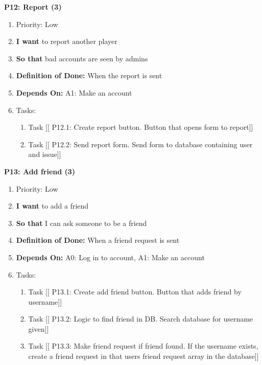 \textbf{P12: Report (3)}
\begin{enumerate}
    \item Priority: Low
    \item \textbf{I want} to report another player
    \item \textbf{So that} bad accounts are seen by admins
    \item \textbf{Definition of Done:} When the report is sent
    \item \textbf{Depends On:} A1: Make an account
    \item Tasks:
    \begin{enumerate}
        \item Task [[ P12.1: Create report button. Button that opens form to report]]
        \item Task [[ P12.2: Send report form. Send form to database containing user and issue]]
    \end{enumerate}
\end{enumerate}

\vspace{2em}

\textbf{P13: Add friend (3)}
\begin{enumerate}
    \item Priority: Low
    \item \textbf{I want} to add a friend
    \item \textbf{So that} I can ask someone to be a friend
    \item \textbf{Definition of Done:} When a friend request is sent
    \item \textbf{Depends On:} A0: Log in to account, A1: Make an account
    \item Tasks:
    \begin{enumerate}
        \item Task [[ P13.1: Create add friend button. Button that adds friend by username]]
        \item Task [[ P13.2: Logic to find friend in DB. Search database for username given]]
        \item Task [[ P13.3: Make friend request if friend found. If the username exists, create a friend request in that users friend request array in the database]]
    \end{enumerate}
\end{enumerate}

